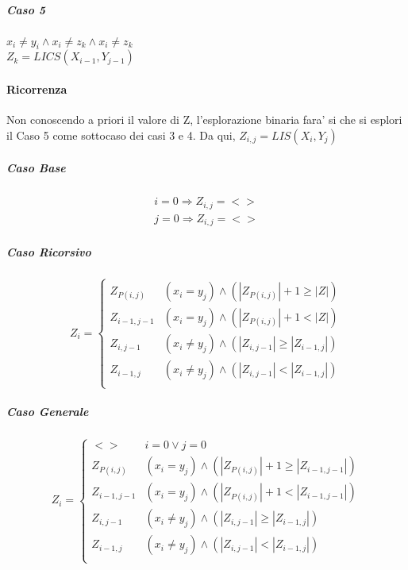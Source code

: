 \subparagraph{Caso 5}

$x_i \ne y_i \land x_i \ne z_k \land x_i \ne z_k$ \\
$Z_k = LICS(X_{i-1}, Y_{j-1})$ \\

\paragraph{Ricorrenza}

Non conoscendo a priori il valore di Z, l'esplorazione binaria fara' si che si esplori il Caso 5 come sottocaso dei casi 3 e 4.
Da qui, $Z_{i,j} = LIS(X_i, Y_j)$

\subparagraph{Caso Base}

\begin{align}
    \text{$i = 0 \Rightarrow Z_{i,j} = <>$} \\
    \text{$j = 0 \Rightarrow Z_{i,j} = <>$}
\end{align}

\subparagraph{Caso Ricorsivo}

\[
    Z_i =
    \begin{cases}
        \text{$Z_{P(i,j)}$} & \text{$(x_i = y_j) \land (|Z_{P(i,j)}| + 1 \geq |Z|)$} \\
        \text{$Z_{i-1, j-1}$} & \text{$(x_i = y_j) \land (|Z_{P(i,j)}| + 1 < |Z|)$} \\
        \text{$Z_{i, j-1}$} & \text{$(x_i \ne y_j) \land (|Z_{i, j-1}| \geq |Z_{i-1, j}|)$} \\
        \text{$Z_{i-1, j}$} & \text{$(x_i \ne y_j) \land (|Z_{i, j-1}| < |Z_{i-1, j}|)$} \\
    \end{cases}
\]

\subparagraph{Caso Generale}

\[
    Z_i =
    \begin{cases}
        \text{$<>$} & \text{$i = 0 \lor j = 0$} \\
        \text{$Z_{P(i,j)}$} & \text{$(x_i = y_j) \land (|Z_{P(i,j)}| + 1 \geq |Z_{i-1, j-1}|)$} \\
        \text{$Z_{i-1, j-1}$} & \text{$(x_i = y_j) \land (|Z_{P(i,j)}| + 1 < |Z_{i-1, j-1}|)$} \\
        \text{$Z_{i, j-1}$} & \text{$(x_i \ne y_j) \land (|Z_{i, j-1}| \geq |Z_{i-1, j}|)$} \\
        \text{$Z_{i-1, j}$} & \text{$(x_i \ne y_j) \land (|Z_{i, j-1}| < |Z_{i-1, j}|)$} \\
    \end{cases}
\]

